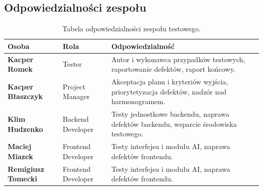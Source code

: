 \documentclass[11pt,a4paper]{article}
\begin{document}
\subsection{Odpowiedzialności zespołu}
\begin{table}[h]
\centering
\begin{tabularx}{\textwidth}{>{\bfseries}p{3.6cm} p{3.2cm} Y}
\toprule
\textbf{Osoba} & \textbf{Rola} & \textbf{Odpowiedzialność} \\
\midrule
Kacper Romek & Tester & Autor i wykonawca przypadków testowych, raportowanie defektów, raport końcowy. \\
Kacper Błaszczyk & Project Manager & Akceptacja planu i kryteriów wyjścia, priorytetyzacja defektów, nadzór nad harmonogramem. \\
Klim Hudzenko & Backend Developer & Testy jednostkowe backendu, naprawa defektów backendu, wsparcie środowiska testowego. \\
Maciej Miazek & Frontend Developer & Testy interfejsu i modułu AI, naprawa defektów frontendu. \\
Remigiusz Tomecki & Frontend Developer & Testy interfejsu i modułu AI, naprawa defektów frontendu. \\
\bottomrule
\end{tabularx}
\caption{Tabela odpowiedzialności zespołu testowego.}
\end{table}
\end{document}
